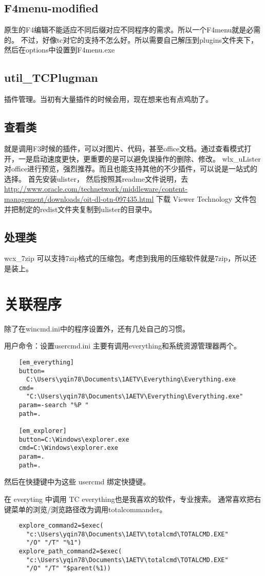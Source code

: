\documentclass[UTF8,AutoFakeBold,zihao=-4,scheme=chinese]{ctexart}
\begin{document}
\subsection{F4menu-modified}
原生的F4编辑不能适应不同后缀对应不同程序的需求。所以一个F4menu就是必需的。
不过，好像tc对它的支持不怎么好。所以需要自己解压到plugins文件夹下，然后在options中设置到F4menu.exe
\subsection{util\_TCPlugman}
插件管理。当初有大量插件的时候会用，现在想来也有点鸡肋了。
\subsection{查看类}
就是调用F3时候的插件，可以对图片、代码，甚至office文档。通过查看模式打开，一是启动速度更快，更重要的是可以避免误操作的删除、修改。
wlx\_uLister 对office进行预览，强烈推荐。而且也能支持其他的不少插件，可以说是一站式的选择。
首先安装ulister，
然后按照其readme文件说明，去 \url{http://www.oracle.com/technetwork/middleware/content-management/downloads/oit-dl-otn-097435.html} 下载 Viewer Technology 文件包
并把制定的redist文件夹复制到ulister的目录中。
\subsection{处理类}
wcx\_7zip 可以支持7zip格式的压缩包。考虑到我用的压缩软件就是7zip，所以还是装上。

\section{关联程序}
除了在wincmd.ini中的程序设置外，还有几处自己的习惯。

用户命令：设置usercmd.ini
主要有调用everything和系统资源管理器两个。

\begin{verbatim}
    [em_everything]
    button=
      C:\Users\yqin78\Documents\1AETV\Everything\Everything.exe
    cmd=
      "C:\Users\yqin78\Documents\1AETV\Everything\Everything.exe"
    param=-search "%P "
    path=.

    [em_explorer]
    button=C:\Windows\explorer.exe
    cmd=C:\Windows\explorer.exe
    param=.
    path=.
\end{verbatim}

然后在快捷键中为这些 usercmd 绑定快捷键。

在 everyting 中调用 TC
everything也是我喜欢的软件，专业搜索。
通常喜欢把右键菜单的浏览/浏览路径改为调用totalcommander。

\begin{verbatim}
    explore_command2=$exec(
      "c:\Users\yqin78\Documents\1AETV\totalcmd\TOTALCMD.EXE"
      "/O" "/T" "%1")
    explore_path_command2=$exec(
      "c:\Users\yqin78\Documents\1AETV\totalcmd\TOTALCMD.EXE"
      "/O" "/T" "$parent(%1))
\end{verbatim}
\end{document}
